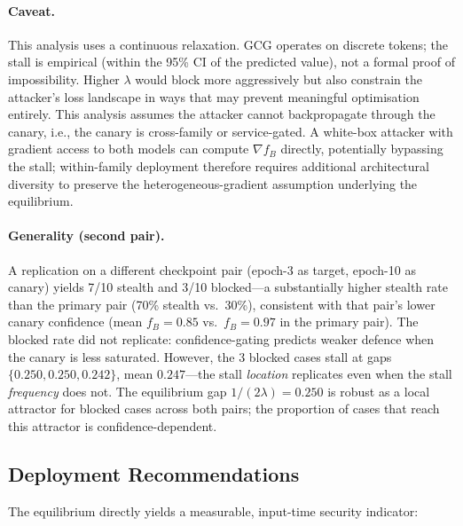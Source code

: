 \paragraph{Caveat.} This analysis uses a continuous relaxation. GCG operates on discrete tokens; the stall is empirical (within the 95\% CI of the predicted value), not a formal proof of impossibility. Higher $\lambda$ would block more aggressively but also constrain the attacker's loss landscape in ways that may prevent meaningful optimisation entirely. This analysis assumes the attacker cannot backpropagate through the canary, i.e., the canary is cross-family or service-gated. A white-box attacker with gradient access to both models can compute $\nabla f_B$ directly, potentially bypassing the stall; within-family deployment therefore requires additional architectural diversity to preserve the heterogeneous-gradient assumption underlying the equilibrium.

\paragraph{Generality (second pair).} A replication on a different checkpoint pair (epoch-3 as target, epoch-10 as canary) yields 7/10 stealth and 3/10 blocked---a substantially higher stealth rate than the primary pair (70\% stealth vs.\ 30\%), consistent with that pair's lower canary confidence (mean $f_B = 0.85$ vs.\ $f_B = 0.97$ in the primary pair). The blocked rate did not replicate: confidence-gating predicts weaker defence when the canary is less saturated. However, the 3 blocked cases stall at gaps $\{0.250, 0.250, 0.242\}$, mean $0.247$---the stall \emph{location} replicates even when the stall \emph{frequency} does not. The equilibrium gap $1/(2\lambda) = 0.250$ is robust as a local attractor for blocked cases across both pairs; the proportion of cases that reach this attractor is confidence-dependent.

\subsection{Deployment Recommendations}
\label{sec:deployment-recs}

The equilibrium directly yields a measurable, input-time security indicator:


